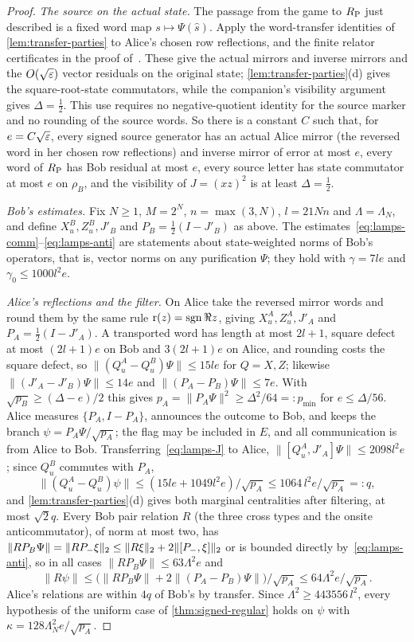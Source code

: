 \begin{proof}
\emph{The source on the actual state.} The passage from the game to $R_{\mathrm P}$ just described is a fixed word map
$s\mapsto\Psi(\hat s)$. Apply the word-transfer identities of \cref{lem:transfer-parties} to Alice's chosen row reflections, and the
finite relator certificates in the proof of~\cite[Theorem~10.5(b), Steps~1--4]{DM-game}. These give the actual mirrors and inverse
mirrors and the $O(\sqrt{\varepsilon})$ vector residuals on the original state; \cref{lem:transfer-parties}(d) gives the square-root-state
commutators, while the companion's visibility argument gives $\Delta=\frac12$. This use requires no negative-quotient identity for the
source marker and no rounding of the source words. So there is a constant $C$ such that, for $e=C\sqrt{\varepsilon}$, every signed source
generator has an actual Alice mirror (the reversed word in her chosen row reflections) and inverse mirror of error at most $e$, every
word of $R_{\mathrm P}$ has Bob residual at most $e$, every source letter has state commutator at most $e$ on $\rho_B$, and the visibility of
$J=(xz)^2$ is at least $\Delta=\frac12$.

\emph{Bob's estimates.} Fix $N\ge1$, $M=2^N$, $n=\max(3,N)$, $l=21Nn$ and $\Lambda=\Lambda_N$, and define $X^B_u,Z^B_u,J'_B$ and
$P_B=\frac12(I-J'_B)$ as above. The estimates~\eqref{eq:lamps-comm}--\eqref{eq:lamps-anti} are statements about state-weighted
norms of Bob's operators, that is, vector norms on any purification $\Psi$; they hold with $\gamma=7le$ and $\gamma_0\le1000l^2e$.

\emph{Alice's reflections and the filter.} On Alice take the reversed mirror words and round them by the same rule
$\mathrm r(z)=\operatorname{sgn}\Re z$, giving $X^A_u,Z^A_u,J'_A$ and $P_A=\frac12(I-J'_A)$. A transported word has length at most $2l+1$, square
defect at most $(2l+1)e$ on Bob and $3(2l+1)e$ on Alice, and rounding costs the square defect, so
$\|(Q^A_u-Q^B_u)\Psi\|\le15le$ for $Q=X,Z$; likewise $\|(J'_A-J'_B)\Psi\|\le14e$ and $\|(P_A-P_B)\Psi\|\le7e$. With $\sqrt{p_B}\ge
(\Delta-e)/2$ this gives $p_A=\|P_A\Psi\|^2\ge\Delta^2/64=:p_{\min}$ for $e\le\Delta/56$. Alice measures $\{P_A,I-P_A\}$, announces the
outcome to Bob, and keeps the branch $\psi=P_A\Psi/\sqrt{p_A}$; the flag may be included in $E$, and all communication is from
Alice to Bob. Transferring~\eqref{eq:lamps-J} to Alice, $\|[Q^A_u,J'_A]\Psi\|\le2098l^2e$; since $Q^B_u$ commutes with $P_A$,
\[
\|(Q^A_u-Q^B_u)\psi\|\le(15le+1049l^2e)/\sqrt{p_A}\le1064\,l^2e/\sqrt{p_A}=:q ,
\]
and \cref{lem:transfer-parties}(d) gives both marginal centralities after filtering, at most $\sqrt2q$. Every Bob pair relation $R$
(the three cross types and the onsite anticommutator), of norm at most two, has
$\|RP_B\Psi\|=\lVert RP_-\xi\rVert_2\le\lVert R\xi\rVert_2+2\lVert [P_-,\xi]\rVert_2$ or is bounded directly by~\eqref{eq:lamps-anti}, so in all cases
$\|RP_B\Psi\|\le63\Lambda^2e$ and
\[
\|R\psi\|\le\bigl(\|RP_B\Psi\|+2\|(P_A-P_B)\Psi\|\bigr)/\sqrt{p_A}\le64\Lambda^2e/\sqrt{p_A}.
\]
Alice's relations are within $4q$ of Bob's by transfer. Since $\Lambda^2\ge443556\,l^2$, every hypothesis of the uniform case of
\cref{thm:signed-regular} holds on $\psi$ with $\kappa=128\Lambda_N^2e/\sqrt{p_A}$.


\end{proof}
